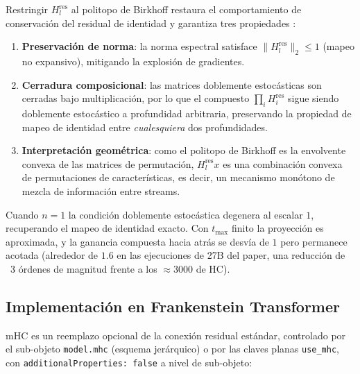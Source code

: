 Restringir $H^{\text{res}}_l$ al politopo de Birkhoff restaura el
comportamiento de conservación del residual de identidad y garantiza tres
propiedades \citep{xie_mhc_2025}:
\begin{enumerate}[leftmargin=*]
    \item \textbf{Preservación de norma}: la norma espectral satisface
        $\|H^{\text{res}}_l\|_2 \le 1$ (mapeo no expansivo), mitigando la
        explosión de gradientes.
    \item \textbf{Cerradura composicional}: las matrices doblemente
        estocásticas son cerradas bajo multiplicación, por lo que el compuesto
        $\prod_i H^{\text{res}}_{i}$ sigue siendo doblemente estocástico a
        profundidad arbitraria, preservando la propiedad de mapeo de identidad
        entre \emph{cualesquiera} dos profundidades.
    \item \textbf{Interpretación geométrica}: como el politopo de Birkhoff es
        la envolvente convexa de las matrices de permutación,
        $H^{\text{res}}_l x$ es una combinación convexa de permutaciones de
        características, es decir, un mecanismo monótono de mezcla de
        información entre streams.
\end{enumerate}
Cuando $n = 1$ la condición doblemente estocástica degenera al escalar $1$,
recuperando el mapeo de identidad exacto. Con $t_{\max}$ finito la proyección
es aproximada, y la ganancia compuesta hacia atrás se desvía de $1$ pero
permanece acotada (alrededor de $1.6$ en las ejecuciones de 27B del paper, una
reducción de ~3 órdenes de magnitud frente a los $\approx 3000$ de HC).

\subsection{Implementación en Frankenstein Transformer}

mHC es un reemplazo opcional de la conexión residual estándar, controlado por
el sub-objeto \texttt{model.mhc} (esquema jerárquico) o por las claves planas
\texttt{use\_mhc}, con \texttt{additionalProperties: false} a nivel de
sub-objeto:

